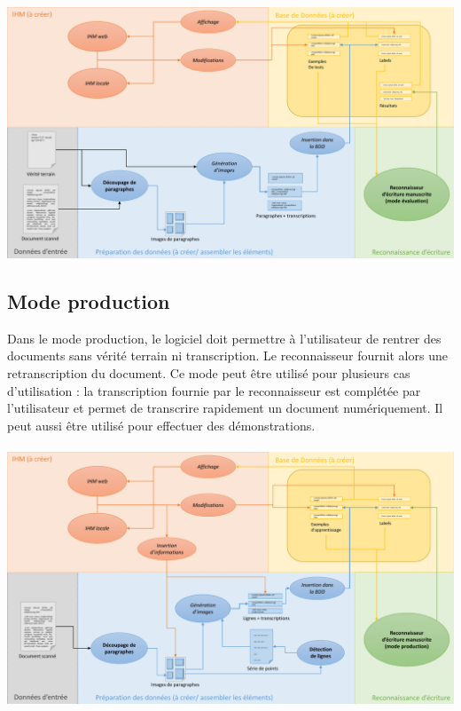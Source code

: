 \paragraph{}
\begin{mdframed}[frametitle={Annexe A.2.2 : Sans détection de lignes}, innerbottommargin=10]
\begin{center}
\includegraphics[width=\linewidth]{schema_mode2.2.pdf}
\end{center}
\end{mdframed}

\subsection{Mode production}

Dans le mode production, le logiciel doit permettre à l’utilisateur de rentrer des documents
sans vérité terrain ni transcription. Le reconnaisseur fournit alors une retranscription du
document. Ce mode peut être utilisé pour plusieurs cas d’utilisation : la transcription fournie
par le reconnaisseur est complétée par l’utilisateur et permet de transcrire rapidement un document
numériquement. Il peut aussi être utilisé pour effectuer des démonstrations.

\newpage

\paragraph{}
\begin{mdframed}[frametitle={Annexe A.3.1 : Avec détection de lignes}, innerbottommargin=10]
\begin{center}
\includegraphics[width=\linewidth]{schema_mode3.1.pdf}
\end{center}
\end{mdframed}

